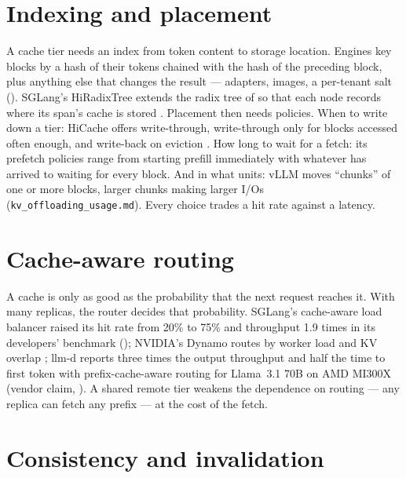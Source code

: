 \section{Indexing and placement}

A cache tier needs an index from token content to storage location. Engines
key blocks by a hash of their tokens chained with the hash of the preceding
block, plus anything else that changes the result --- adapters, images, a
per-tenant salt (). SGLang's HiRadixTree extends the radix
tree of  so that each node records where its span's cache
is stored \cite{sglang2026hicache}. Placement then needs policies. When to write
down a tier: HiCache offers write-through, write-through only for blocks
accessed often enough, and write-back on eviction \cite{sglang2026hicache}. How
long to wait for a fetch: its prefetch policies range from starting prefill
immediately with whatever has arrived to waiting for every block. And in what
units: vLLM moves ``chunks'' of one or more blocks, larger chunks making larger
I/Os (\texttt{kv\_offloading\_usage.md}). Every choice trades a hit rate against a
latency.

\section{Cache-aware routing}

A cache is only as good as the probability that the next request reaches it.
With many replicas, the router decides that probability. SGLang's cache-aware
load balancer raised its hit rate from 20\% to 75\% and throughput 1.9 times in
its developers' benchmark (); NVIDIA's Dynamo routes by
worker load and KV overlap \cite{nvidia2026dynamo}; llm-d reports three times the
output throughput and half the time to first token with prefix-cache-aware
routing for Llama~3.1 70B on AMD MI300X (vendor claim, \cite{llmd2026}). A shared
remote tier weakens the dependence on routing --- any replica can fetch any
prefix --- at the cost of the fetch.

\section{Consistency and invalidation}

